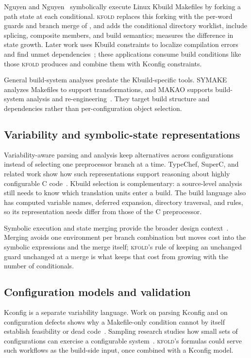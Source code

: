 \documentclass[acmsmall,screen,review]{acmart}
\newcommand{\tool}{\textsc{kfold}\xspace}
\begin{document}
Nguyen and Nguyen~\cite{nguyen2020using} symbolically execute Linux Kbuild Makefiles by forking a path state at each conditional. \tool replaces this forking with the per-word guards and branch merge of , and adds the conditional directory worklist, include splicing, composite members, and build semantics;  measures the difference in state growth. Later work uses Kbuild constraints to localize compilation errors and find unmet dependencies~\cite{gazzillo2018localizing,oh2021kclause}; these applications consume build conditions like those \tool produces and combine them with Kconfig constraints.

General build-system analyses predate the Kbuild-specific tools. \textsc{SYMAKE} analyzes Makefiles to support transformations, and \textsc{MAKAO} supports build-system analysis and re-engineering~\cite{tamrawi2012symake,adams2007makao}. They target build structure and dependencies rather than per-configuration object selection.

\subsection{Variability and symbolic-state representations}
Variability-aware parsing and analysis keep alternatives across configurations instead of selecting one preprocessor branch at a time. TypeChef, SuperC, and related work show how such representations support reasoning about highly configurable C code~\cite{kenner2010typechef,kastner2011variability,gazzillo2012superc,liebig2011variability}. Kbuild selection is complementary: a source-level analysis still needs to know which translation units enter a build. The build language also has computed variable names, deferred expansion, directory traversal, and rules, so its representation needs differ from those of the C preprocessor.

Symbolic execution and state merging provide the broader design context~\cite{king1976symbolic,kuznetsov2012efficient}. Merging avoids one environment per branch combination but moves cost into the symbolic expressions and the merge itself; \tool's rule of keeping an unchanged guard unchanged at a merge is what keeps that cost from growing with the number of conditionals.

\subsection{Configuration models and validation}
Kconfig is a separate variability language. Work on parsing Kconfig and on configuration defects shows why a Makefile-only condition cannot by itself establish feasibility or dead code~\cite{dietrich2012variability,nadi2014where,tartler2011dead}. Sampling research studies how small sets of configurations can exercise a configurable system~\cite{medeiros2016comparison}. \tool's formulas could serve such workflows as the build-side input, once combined with a Kconfig model.
\end{document}
